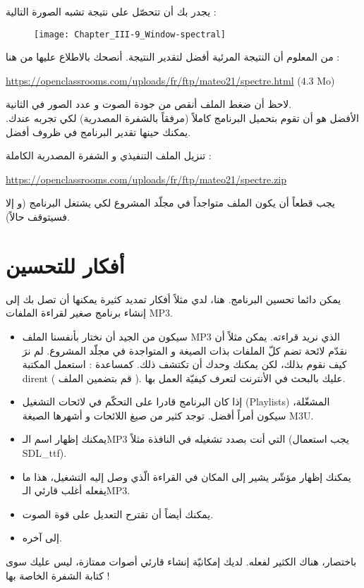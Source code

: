 يجدر بك أن تتحصّل على نتيجة تشبه الصورة التالية :

\begin{figure}[H]
	\centering
	\texttt{[image: Chapter\_III-9\_Window-spectral]}
\end{figure}

من المعلوم أن النتيجة المرئية أفضل لتقدير النتيجة. أنصحك بالاطلاع عليها من هنا :

\textenglish{\url{https://openclassrooms.com/uploads/fr/ftp/mateo21/spectre.html} (4.3 Mo)}

لاحظ أن ضغط الملف أنقص من جودة الصوت و عدد الصور في الثانية.\\
الأفضل هو أن تقوم بتحميل البرنامج كاملاً (مرفقاً بالشفرة المصدرية) لكي تجربه عندك. يمكنك حينها تقدير البرنامج في ظروف أفضل.

تنزيل الملف التنفيذي و الشفرة المصدرية الكاملة :

\url{https://openclassrooms.com/uploads/fr/ftp/mateo21/spectre.zip}

\begin{critical}
يجب قطعاً أن يكون الملف
متواجداً في مجلّد المشروع لكي يشتغل البرنامج (و إلا فسيتوقف حالاً).
\end{critical}

\section*{أفكار للتحسين}

يمكن دائما تحسين البرنامج. هنا، لدي مثلاً أفكار تمديد كثيرة يمكنها أن تصل بك إلى إنشاء برنامج صغير لقراءة الملفات
\textenglish{MP3}.

\begin{itemize}
	\item سيكون من الجيد أن نختار بأنفسنا الملف
	\textenglish{MP3}
	الذي نريد قراءته. يمكن مثلاً أن نقدّم لائحة تضم كلّ الملفات بذات الصيغة و المتواجدة في مجلّد المشروع. لم نرَ كيف نقوم بذلك، لكن يمكنك وحدك أن تكتشف ذلك. كمساعدة : استعمل المكتبة
	\textenglish{dirent}
	( قم بتضمين الملف 
	).
	عليك بالبحث في الأنترنت لتعرف كيفيّة العمل بها.
	\item إذا كان البرنامج قادرا على التحكّم في لائحات التشغيل
	(\textenglish{Playlists})
	المشغّلة، سيكون أمراً أفضل. توجد كثير من صيغ اللائحات و أشهرها الصيغة
	\textenglish{M3U}.
	\item يمكنك إظهار اسم الـ\textenglish{MP3}
	التي أنت بصدد تشغيله في النافذة مثلاً (يجب استعمال
	\textenglish{SDL\_ttf}).
	\item يمكنك إظهار مؤشّر يشير إلى المكان في القراءة الّذي وصل إليه التشغيل، هذا ما يفعله أغلب قارئي الـ\textenglish{MP3}.
	\item يمكنك أيضاً أن تقترح التعديل على قوة الصوت.
	\item إلى آخره.
\end{itemize}

باختصار، هناك الكثير لفعله. لديك إمكانيّة إنشاء قارئي أصوات ممتازة، ليس عليك سوى كتابة الشفرة الخاصة بها !
